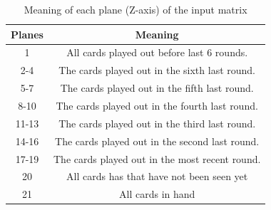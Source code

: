 \documentclass{article}
\begin{document}
\begin{table}[!ht]
    \caption{Meaning of each plane (Z-axis) of the input matrix}\label{Zinput}
    \centering
    \begin{threeparttable}          
      \begin{tabular}{cc}\toprule
        
Planes & Meaning                                        \\ \hline
1      & All cards played out before last 6 rounds.     \\
2-4    & The cards played out in the sixth last round.  \\
5-7    & The cards played out in the fifth last round.  \\
8-10   & The cards played out in the fourth last round. \\
11-13  & The cards played out in the third last round.  \\
14-16  & The cards played out in the second last round. \\
17-19  & The cards played out in the most recent round. \\
20     & All cards has that have not been seen yet      \\
21     & All cards in hand                              \\ \hline
      \end{tabular}
    \end{threeparttable}  
  \end{table}
  
\end{document}
